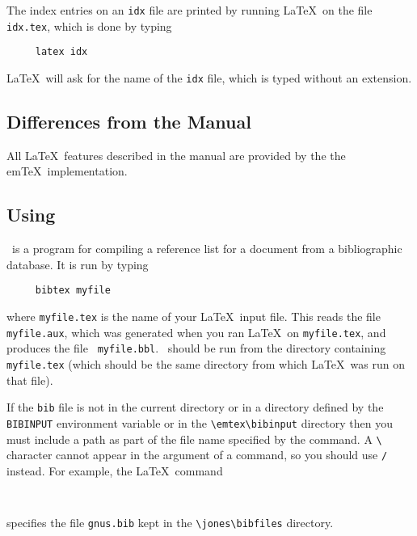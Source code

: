 The index entries on an {\tt idx} file are printed by running \LaTeX\
on the file \mbox{\tt idx.tex}, which is done by typing
\begin{verbatim}
     latex idx
\end{verbatim}
\LaTeX\ will ask for the name of the {\tt idx} file, which is typed
without an extension.
 
 
 
\subsection{Differences from the Manual}
 
All \LaTeX\ features described in the manual are provided by 
the the em\TeX\ implementation.
 
 
 
 
 
\subsection{Using \BibTeX}
 
\BibTeX\ is a program for compiling a reference list for a document
from a bibliographic database.  It is run by typing
\begin{verbatim}
     bibtex myfile
\end{verbatim}
where \mbox{\tt myfile.tex} is the name of your \LaTeX\ input file.
This reads the file \mbox{\tt myfile.aux}, which was generated when you
ran \LaTeX\ on \mbox{\tt myfile.tex}, and produces the file \mbox{\tt
myfile.bbl}.  \BibTeX\ should be run from the directory containing
\mbox{\tt myfile.tex} (which should be the same directory from which
\LaTeX\ was run on that file).
 
If the {\tt bib} file is not in the current directory or in a directory
defined by the \verb|BIBINPUT| environment variable or in the
\verb|\emtex\bibinput| directory
then you must include a path as part of the file name specified
by the \hbox{\verb||} command.  A \verb|\| character cannot
appear in the argument of a \hbox{\verb||} command, so you
should use \verb|/| instead.  For example, the \LaTeX\ command
\begin{verbatim}
     
\end{verbatim}
specifies the file \mbox{\tt gnus.bib} kept in the \verb|\jones\bibfiles|
directory.
 
